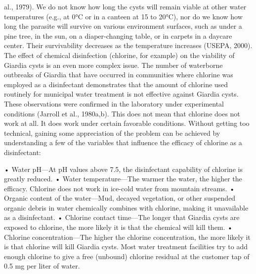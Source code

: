 \documentclass{article}
\begin{document}
al., 1979). We do not know how long the cysts will remain viable at
other water temperatures (e.g., at 0°C or in a canteen at 15 to 20°C),
nor do we know how long the parasite will survive on various environment
surfaces, such as under a pine tree, in the sun, on a diaper-changing
table, or in carpets in a daycare center. Their survivability decreases
as the temperature increases (USEPA, 2000). The effect of chemical
disinfection (chlorine, for example) on the viability of Giardia cysts
is an even more complex issue. The number of waterborne outbreaks of
Giardia that have occurred in communities where chlorine was employed as
a disinfectant demonstrates that the amount of chlorine used routinely
for municipal water treatment is not effective against Giardia cysts.
These observations were confirmed in the laboratory under experimental
conditions (Jarroll et al., 1980a,b). This does not mean that chlorine
does not work at all. It does work under certain favorable conditions.
Without getting too technical, gaining some appreciation of the problem
can be achieved by understanding a few of the variables that influence
the efficacy of chlorine as a disinfectant:

• Water pH---At pH values above 7.5, the disinfectant capability of
chlorine is greatly reduced. • Water temperature---The warmer the water,
the higher the efficacy. Chlorine does not work in ice-cold water from
mountain streams. • Organic content of the water---Mud, decayed
vegetation, or other suspended organic debris in water chemically
combines with chlorine, making it unavailable as a disinfectant. •
Chlorine contact time---The longer that Giardia cysts are exposed to
chlorine, the more likely it is that the chemical will kill them. •
Chlorine concentration---The higher the chlorine concentration, the more
likely it is that chlorine will kill Giardia cysts. Most water treatment
facilities try to add enough chlorine to give a free (unbound) chlorine
residual at the customer tap of 0.5 mg per liter of water.
\end{document}
